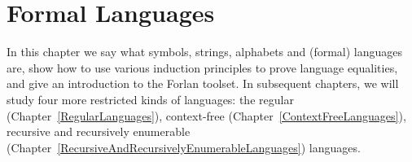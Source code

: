 \chapter{Formal Languages}
\label{FormalLanguages}

In this chapter we say what symbols, strings, alphabets and (formal)
languages are, show how to use various induction principles to prove
language equalities, and give an introduction to the Forlan toolset.
In subsequent chapters, we
will study four more restricted kinds of languages: the regular
(Chapter~\ref{RegularLanguages}),
context-free (Chapter~\ref{ContextFreeLanguages}),
recursive and recursively enumerable
(Chapter~\ref{RecursiveAndRecursivelyEnumerableLanguages}) languages.






